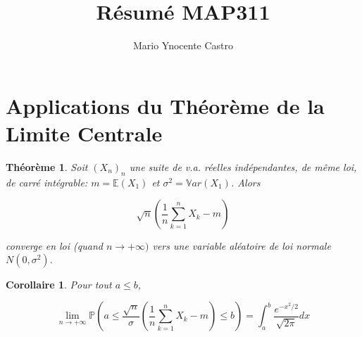 \documentclass[10pt,a4paper,oneside]{article}
\newtheorem{theoreme}{Théorème}
\newtheorem{corollaire}{Corollaire}
\begin{document}
\title{Résumé MAP311}
\author{Mario Ynocente Castro}

\maketitle

\section{Applications du Théorème de la Limite Centrale}

\begin{theoreme}
Soit $(X_n)_n$ une suite de v.a. réelles indépendantes, de même loi, de carré intégrable: $m = \mathbb{E}(X_1)$ et $\sigma^2 = \mathbb{V}ar(X_1)$. Alors

\[ \sqrt{n}(\frac{1}{n}\sum_{k = 1}^n X_k - m) \]

converge en loi (quand $n \to +\infty)$ vers une variable aléatoire de loi normale $N(0,\sigma^2).$
\end{theoreme}


\begin{corollaire}
Pour tout $a \leq b$,

\[ \lim\limits_{n \to +\infty} \mathbb{P}( a \leq \frac{\sqrt{n}}{\sigma}(\frac{1}{n}\sum_{k = 1}^n X_k - m) \leq b ) = \int_{a}^{b}  \frac{e^{ -x^2/2 }}{\sqrt{2 \pi }} dx \]
\end{corollaire}
\end{document}
